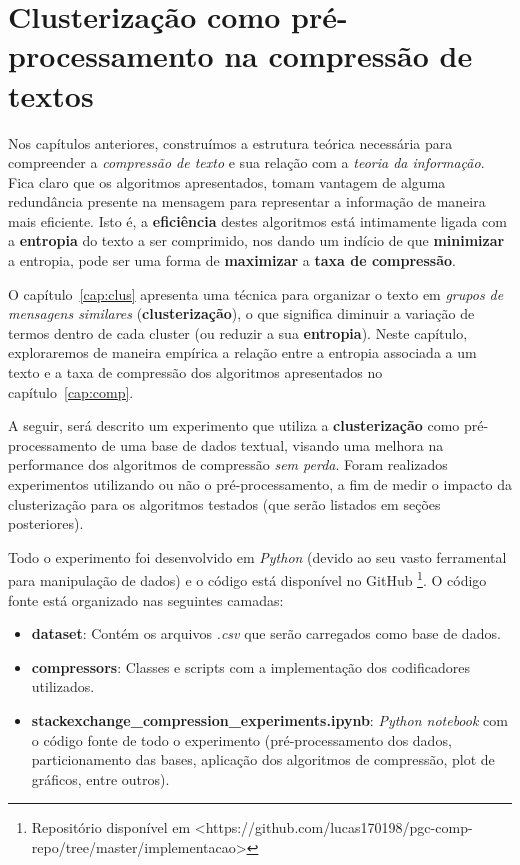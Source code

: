 
\chapter{Clusterização como pré-processamento na compressão de textos}
Nos capítulos anteriores, construímos a estrutura teórica necessária para compreender a \emph{compressão de texto} e sua relação com a \emph{teoria da informação}.
Fica claro que os algoritmos apresentados, tomam vantagem de alguma redundância presente na mensagem para representar a informação de maneira mais eficiente.
Isto é, a \textbf{eficiência} destes algoritmos está intimamente ligada com a \textbf{entropia} do texto a ser comprimido,
 nos dando um indício de que \textbf{minimizar} a entropia, pode ser uma forma de \textbf{maximizar} a \textbf{taxa de compressão}.
 
O capítulo~\ref{cap:clus} apresenta uma técnica para organizar o texto em \emph{grupos de mensagens similares} (\textbf{clusterização}), o que significa diminuir a variação de termos dentro de cada cluster (ou reduzir a sua \textbf{entropia}).
Neste capítulo, exploraremos de maneira empírica a relação entre a entropia associada a um texto e a taxa de compressão dos algoritmos apresentados no capítulo~\ref{cap:comp}.

A seguir, será descrito um experimento que utiliza a \textbf{clusterização} como pré-processamento de uma base de dados textual, visando uma melhora na performance dos algoritmos de compressão \emph{sem perda}.
Foram realizados experimentos utilizando ou não o pré-processamento, a fim de medir o impacto da clusterização para os algoritmos testados (que serão listados em seções posteriores).

Todo o experimento foi desenvolvido em \emph{Python} (devido ao seu vasto ferramental para manipulação de dados)
 e o código está disponível no GitHub 
 \footnote{Repositório disponível em <https://github.com/lucas170198/pgc-comp-repo/tree/master/implementacao>}.
O código fonte está organizado nas seguintes camadas:
\begin{itemize}
	\item \textbf{dataset}: Contém os arquivos \emph{.csv} que serão carregados como base de dados.
	\item \textbf{compressors}: Classes e scripts com a implementação dos codificadores utilizados.
	\item \textbf{stackexchange\_compression\_experiments.ipynb}: \emph{Python notebook} com o código fonte de todo o experimento (pré-processamento dos dados, particionamento das bases, aplicação dos algoritmos de compressão, plot de gráficos, entre outros).
\end{itemize}
\pagebreak

